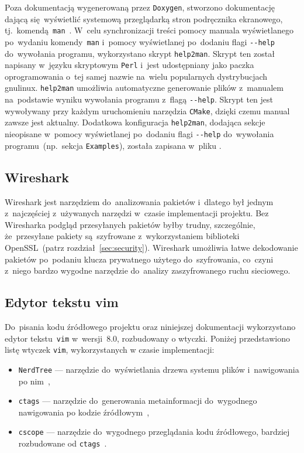 \documentclass[thesis]{subfiles}
\begin{document}
Poza dokumentacją wygenerowaną przez \texttt{Doxygen}, stworzono dokumentację dającą się~wyświetlić systemową przeglądarką stron podręcznika ekranowego, tj.~komendą~\texttt{man}~\cite{tldp-create-manpage}. W~celu synchronizacji treści pomocy manuala wyświetlanego po~wydaniu komendy~\texttt{man} i~pomocy wyświetlanej po~dodaniu flagi \texttt{-{}-help} do~wywołania programu, wykorzystano skrypt \texttt{help2man}. Skrypt ten został napisany w~języku skryptowym \texttt{Perl} i~jest udostępniany jako paczka oprogramowania o~tej samej nazwie na~wielu popularnych dystrybucjach \gls{gnulinux}. \texttt{help2man} umożliwia automatyczne generowanie plików z~manualem na~podstawie wyniku wywołania programu z~flagą \texttt{-{}-help}. Skrypt ten jest wywoływany przy każdym uruchomieniu narzędzia \texttt{CMake}, dzięki czemu manual zawsze jest aktualny. Dodatkowa konfiguracja \texttt{help2man}, dodająca sekcje nieopisane w~pomocy wyświetlanej po~dodaniu flagi \texttt{-{}-help} do~wywołania programu~(np.~sekcja \texttt{Examples}), została zapisana w~pliku .


\subsection{Wireshark}

Wireshark jest narzędziem do~analizowania pakietów i~dlatego był jednym z~najczęściej z~używanych narzędzi w~czasie implementacji projektu. Bez Wiresharka podgląd przesyłanych pakietów byłby trudny, szczególnie, że~przesyłane pakiety są~szyfrowane z~wykorzystaniem biblioteki OpenSSL~(patrz rozdział~\ref{sec:security}). Wireshark umożliwia łatwe dekodowanie pakietów po~podaniu klucza prywatnego użytego do~szyfrowania, co~czyni z~niego bardzo wygodne narzędzie do~analizy zaszyfrowanego ruchu sieciowego.


\subsection{Edytor tekstu vim}

Do~pisania kodu źródłowego projektu oraz niniejszej dokumentacji wykorzystano edytor tekstu~\texttt{vim} w~wersji~8.0, rozbudowany o wtyczki. Poniżej przedstawiono listę wtyczek \texttt{vim}, wykorzystanych w czasie implementacji:
\begin{itemize}
	\item\texttt{NerdTree} --- narzędzie do~wyświetlania drzewa systemu plików i~nawigowania po nim~\cite{nerdtree-vimorg,nerdtree-github},
	\item\texttt{ctags} --- narzędzie do~generowania metainformacji do~wygodnego nawigowania po kodzie źródłowym~\cite{ctags},
	\item\texttt{cscope} --- narzędzie do~wygodnego przeglądania kodu źródłowego, bardziej rozbudowane od \texttt{ctags}~\cite{cscope}.
\end{itemize}
\end{document}
